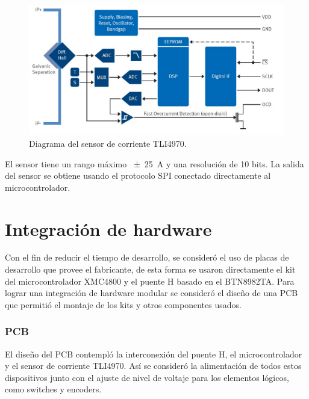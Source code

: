 \begin{figure}[H]
  \centering
  \includegraphics[scale=.45]{img/cap3/tli4970}
  \caption{Diagrama del sensor de corriente TLI4970.}
  \label{cap3_tli4970}
\end{figure}

El sensor tiene un rango máximo \SI{\pm 25}{\ampere} y una resolución de 10 bits. La salida del sensor se obtiene usando el protocolo SPI conectado directamente al microcontrolador.

\section{Integración de hardware}

Con el fin de reducir el tiempo de desarrollo, se consideró el uso de placas de desarrollo que provee el fabricante, de esta forma se usaron directamente el kit del microcontrolador XMC4800 y el puente H basado en el BTN8982TA. Para lograr una integración de hardware modular se consideró el diseño de una PCB que permitió el montaje de los kits y otros componentes usados.

\subsubsection{PCB}

El diseño del PCB contempló la interconexión del puente H, el microcontrolador y el sensor de corriente TLI4970. Así se consideró la alimentación de todos estos dispositivos junto con el ajuste de nivel de voltaje para los elementos lógicos, como switches y encoders.



